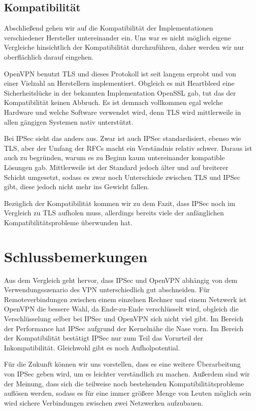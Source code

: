 \documentclass[12pt]{scrartcl}
\begin{document}
\subsection{Kompatibilität}
Abschließend gehen wir auf die Kompatibilität der Implementationen verschiedener Hersteller untereinander ein. Uns war es nicht möglich eigene Vergleiche hinsichtlich der Kompatibilität durchzuführen, daher werden wir nur oberflächlich darauf eingehen.

OpenVPN benutzt TLS und dieses Protokoll ist seit langem erprobt und von einer Vielzahl an Herstellern implementiert. Obgleich es mit Heartbleed eine Sicherheitslücke in der bekannten Implementation OpenSSL gab, tut das der Kompatibilität keinen Abbruch. Es ist demnach vollkommen egal welche Hardware und welche Software verwendet wird, denn TLS wird mittlerweile in allen gängigen Systemen nativ unterstützt.

Bei IPSec sieht das anders aus. Zwar ist auch IPSec standardisiert, ebenso wie TLS, aber der Umfang der RFCs macht ein Verständnis relativ schwer. Daraus ist auch zu begründen, warum es zu Beginn kaum untereinander kompatible Lösungen gab\cite{Alshamsi2005}. Mittlerweile ist der Standard jedoch älter und auf breiterer Schicht umgesetzt, sodass es zwar noch Unterschiede zwischen TLS und IPSec gibt, diese jedoch nicht mehr ins Gewicht fallen.

Bezüglich der Kompatibilität kommen wir zu dem Fazit, dass IPSec noch im Vergleich zu TLS aufholen muss, allerdings bereits viele der anfänglichen Kompatibilitätsprobleme überwunden hat.

\section{Schlussbemerkungen}
Aus dem Vergleich geht hervor, dass IPSec und OpenVPN abhängig von dem Verwendungsszenario des VPN unterschiedlich gut abschneiden. Für Remoteverbindungen zwischen einem einzelnen Rechner und einem Netzwerk ist OpenVPN die bessere Wahl, da Ende-zu-Ende verschlüsselt wird, obgleich die Verschlüsselung selber bei IPSec und OpenVPN sich nicht viel gibt. Im Bereich der Performance hat IPSec aufgrund der Kernelnähe die Nase vorn. Im Bereich der Kompatibilität bestätigt IPSec nur zum Teil das Vorurteil der Inkompatibilität. Gleichwohl gibt es noch Aufholpotential.

Für die Zukunft können wir uns vorstellen, dass es eine weitere Überarbeitung von IPSec geben wird, um es leichter verständlich zu machen. Außerdem sind wir der Meinung, dass sich die teilweise noch bestehenden Kompatibilitätsprobleme auflösen werden, sodass es für eine immer größere Menge von Leuten möglich sein wird sichere Verbindungen zwischen zwei Netzwerken aufzubauen.
\end{document}
